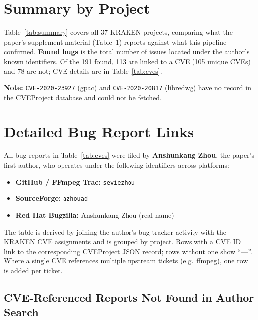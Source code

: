 \documentclass[11pt,a4paper]{article}
\begin{document}
\section{Summary by Project}
\label{sec:summary}

Table~\ref{tab:summary} covers all 37 KRAKEN projects, comparing what the paper's supplement
material (Table~1) reports against what this pipeline confirmed.
\textbf{Found bugs} is the total number of issues located under the author's known identifiers.
Of the 191 found, 113 are linked to a CVE (105 unique CVEs) and 78 are not;
CVE details are in Table~\ref{tab:cves}.



\noindent\textbf{Note:}
\texttt{CVE-2020-23927} (gpac) and \texttt{CVE-2020-20817} (libredwg) have no record in the CVEProject database and could not be fetched.

\section{Detailed Bug Report Links}
\label{sec:links}

All bug reports in Table~\ref{tab:cves} were filed by \textbf{Anshunkang Zhou}, the paper's
first author, who operates under the following identifiers across platforms:
\begin{itemize}[nosep]
    \item \textbf{GitHub / FFmpeg Trac:} \texttt{seviezhou}
    \item \textbf{SourceForge:} \texttt{azhouad}
    \item \textbf{Red Hat Bugzilla:} Anshunkang Zhou (real name)
\end{itemize}

The table is derived by joining the author's bug tracker activity with the KRAKEN CVE
assignments and is grouped by project. Rows with a CVE ID link to the corresponding
CVEProject JSON record; rows without one show ``---''. Where a single CVE references
multiple upstream tickets (e.g.\ ffmpeg), one row is added per ticket.



\subsection*{CVE-Referenced Reports Not Found in Author Search}
\label{sec:orphans}
\end{document}
